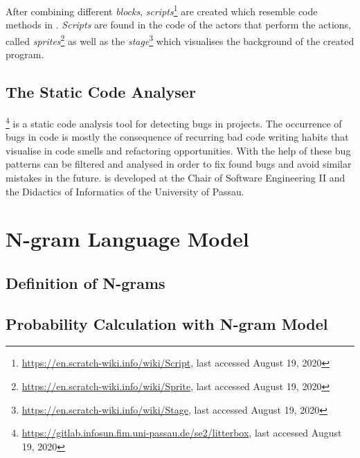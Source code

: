 After combining different \textit{blocks}, \textit{scripts}\footnote{\url{https://en.scratch-wiki.info/wiki/Script}, last accessed August 19, 2020} are created which resemble code methods in \java{}. \textit{Scripts} are found in the code of the actors that perform the actions, called \textit{sprites}\footnote{\url{https://en.scratch-wiki.info/wiki/Sprite}, last accessed August 19, 2020} as well as the \textit{stage}\footnote{\url{https://en.scratch-wiki.info/wiki/Stage}, last accessed August 19, 2020} which visualises the background of the created program. 


\subsection{The Static \scratch{} Code Analyser \litterbox{}}\label{subsec:litterbox}
\litterbox{}\footnote{\url{https://gitlab.infosun.fim.uni-passau.de/se2/litterbox}, last accessed August 19, 2020} is a static code analysis tool for detecting bugs in \scratch{} projects. The occurrence of bugs in code is mostly the consequence of recurring bad code writing habits that visualise in code smells and refactoring opportunities. With the help of \litterbox{} these bug patterns can be filtered and analysed in order to fix found bugs and avoid similar mistakes in the future. \litterbox{} is developed at the Chair of Software Engineering II and the Didactics of Informatics of the University of Passau.



\section{N-gram Language Model}\label{sec:language-models}

\subsection{Definition of N-grams}\label{subsec:ngram}

\subsection{Probability Calculation with N-gram Model}\label{subsec:ngram}





